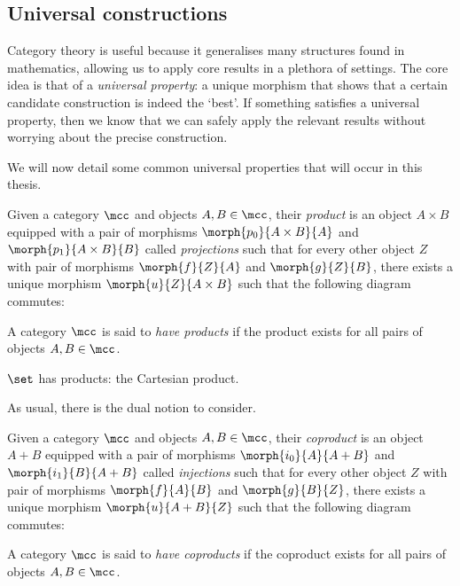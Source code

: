 \subsection{Universal constructions}

Category theory is useful because it generalises many structures found in
mathematics, allowing us to apply core results in a plethora of settings.
The core idea is that of a \emph{universal property}: a unique morphism that
shows that a certain candidate construction is indeed the `best'.
If something satisfies a universal property, then we know that we can safely
apply the relevant results without worrying about the precise construction.

We will now detail some common universal properties that will occur in this
thesis.

\begin{definition}[Product]
    Given a category \(\mcc\) and objects \(A,B \in \mcc\), their \emph{product}
    is an object \(A \times B\) equipped with a pair of morphisms
    \(\morph{p_0}{A \times B}{A}\) and \(\morph{p_1}{A \times B}{B}\) called
    \emph{projections} such that for every other object \(Z\) with pair of
    morphisms \(\morph{f}{Z}{A}\) and \(\morph{g}{Z}{B}\), there exists a unique
    morphism \(\morph{u}{Z}{A \times B}\) such that the following diagram
    commutes:
    \begin{center}
        
    \end{center}
    A category \(\mcc\) is said to \emph{have products} if the product exists
    for all pairs of objects \(A,B \in \mcc\).
\end{definition}

\begin{example}
    \(\set\) has products: the Cartesian product.
\end{example}

As usual, there is the dual notion to consider.

\begin{definition}[Coproduct]
    Given a category \(\mcc\) and objects \(A,B \in \mcc\), their \emph{coproduct}
    is an object \(A + B\) equipped with a pair of morphisms
    \(\morph{i_0}{A}{A + B}\) and \(\morph{i_1}{B}{A + B}\) called
    \emph{injections} such that for every other object \(Z\) with pair of
    morphisms \(\morph{f}{A}{B}\) and \(\morph{g}{B}{Z}\), there exists a unique
    morphism \(\morph{u}{A + B}{Z}\) such that the following diagram
    commutes:
    \begin{center}
        
    \end{center}
    A category \(\mcc\) is said to \emph{have coproducts} if the coproduct
    exists for all pairs of objects \(A,B \in \mcc\).
\end{definition}

